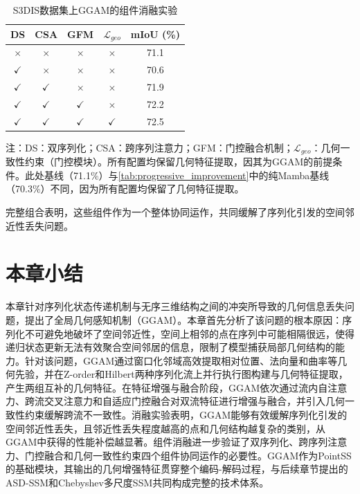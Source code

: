 \documentclass[12pt,a4paper,openany,oneside]{ctexbook}
\theoremstyle{definition}
\theoremstyle{remark}
\begin{document}
\begin{table}[htbp!]
	\centering
	\caption{S3DIS数据集上GGAM的组件消融实验}
	\label{tab:ggam_components}
	\begin{tabular}{@{}ccccc@{}}
		\toprule
		DS & CSA & GFM & $\mathcal{L}_{geo}$ & mIoU (\%) \\
		\midrule
		$\times$ & $\times$ & $\times$ & $\times$ & 71.1 \\
		$\checkmark$ & $\times$ & $\times$ & $\times$ & 70.6 \\
		$\checkmark$ & $\checkmark$ & $\times$ & $\times$ & 71.9 \\
		$\checkmark$ & $\checkmark$ & $\checkmark$ & $\times$ & 72.2 \\
		$\checkmark$ & $\checkmark$ & $\checkmark$ & $\checkmark$ & 72.5 \\
		\bottomrule
	\end{tabular}
	\par\vspace{3pt}
	\footnotesize 注：DS：双序列化；CSA：跨序列注意力；GFM：门控融合机制；$\mathcal{L}_{geo}$：几何一致性约束（门控模块）。所有配置均保留几何特征提取，因其为GGAM的前提条件。此处基线（71.1\%）与\cref{tab:progressive_improvement}中的纯Mamba基线（70.3\%）不同，因为所有配置均保留了几何特征提取。
\end{table}

完整组合表明，这些组件作为一个整体协同运作，共同缓解了序列化引发的空间邻近性丢失问题。


\section{本章小结}

本章针对序列化状态传递机制与无序三维结构之间的冲突所导致的几何信息丢失问题，提出了全局几何感知机制（GGAM）。本章首先分析了该问题的根本原因：序列化不可避免地破坏了空间邻近性，空间上相邻的点在序列中可能相隔很远，使得递归状态更新无法有效聚合空间邻居的信息，限制了模型捕获局部几何结构的能力。针对该问题，GGAM通过窗口化邻域高效提取相对位置、法向量和曲率等几何先验，并在Z-order和Hilbert两种序列化流上并行执行图构建与几何特征提取，产生两组互补的几何特征。在特征增强与融合阶段，GGAM依次通过流内自注意力、跨流交叉注意力和自适应门控融合对双流特征进行增强与融合，并引入几何一致性约束缓解跨流不一致性。消融实验表明，GGAM能够有效缓解序列化引发的空间邻近性丢失，且邻近性丢失程度越高的点和几何结构越复杂的类别，从GGAM中获得的性能补偿越显著。组件消融进一步验证了双序列化、跨序列注意力、门控融合和几何一致性约束四个组件协同运作的必要性。GGAM作为PointSS的基础模块，其输出的几何增强特征贯穿整个编码-解码过程，与后续章节提出的ASD-SSM和Chebyshev多尺度SSM共同构成完整的技术体系。
\end{document}

